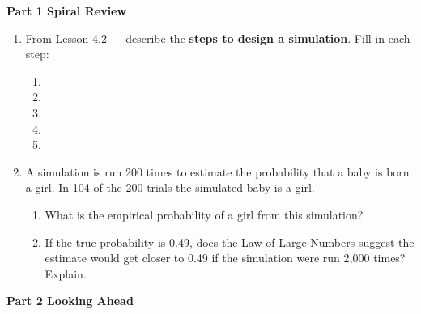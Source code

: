 \documentclass[10pt]{article}
\begin{document}
\namedateperiod

\vspace{0.3in}

{\large\bfseries\color{navy} Part 1 \quad Spiral Review}

\vspace{0.12in}

\begin{enumerate}

    \item From Lesson 4.2 --- describe the \textbf{steps to design a simulation}. Fill in
    each step:
    \begin{enumerate}[label=(\arabic*), itemsep=6pt]
        \item \blank{10cm}
        \item \blank{10cm}
        \item \blank{10cm}
        \item \blank{10cm}
        \item \blank{10cm}
    \end{enumerate}

    \vspace{0.16in}

    \item A simulation is run 200 times to estimate the probability that a baby is born
    a girl. In 104 of the 200 trials the simulated baby is a girl.

    \begin{enumerate}[label=(\alph*), itemsep=6pt]
        \item What is the empirical probability of a girl from this simulation?\\
              \blank{4cm}
        \item If the true probability is 0.49, does the Law of Large Numbers suggest
              the estimate would get closer to 0.49 if the simulation were run 2{,}000
              times? Explain.\\
              \writeline\writeline
    \end{enumerate}

\end{enumerate}

\vspace{0.25in}

{\large\bfseries\color{navy} Part 2 \quad Looking Ahead}
\end{document}
